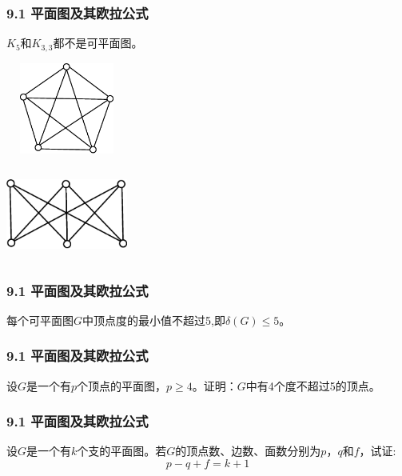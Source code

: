 \documentclass{beamer}
\begin{document}
\begin{CJK}{UTF8}{gbsn}
\begin{frame}
\end{frame}
\begin{frame}
  \frametitle{9.1 平面图及其欧拉公式}
  \begin{corollary9.1.5}
    $K_5$和$K_{3,3}$都不是可平面图。
  \end{corollary9.1.5}
\vspace{1cm}
  \begin{minipage}{0.45\linewidth}
\includegraphics[width=4cm,height=3cm]{k5}    
  \end{minipage}
  \begin{minipage}{0.45\linewidth}
    \includegraphics[width=4cm,height=3cm]{k33}
  \end{minipage}
\end{frame}
\begin{frame}
  \frametitle{9.1 平面图及其欧拉公式}
  \begin{corollary9.1.6}
    每个可平面图$G$中顶点度的最小值不超过5,即$\delta (G) \leq 5$。
  \end{corollary9.1.6}
\end{frame}
\begin{frame}
  \frametitle{9.1 平面图及其欧拉公式}
  \begin{exercise1}
    设$G$是一个有$p$个顶点的平面图，$p \geq 4$。证明：$G$中有4个度不超过5的顶点。
  \end{exercise1}
\end{frame}
\begin{frame}
  \frametitle{9.1 平面图及其欧拉公式}
  \begin{exercise2}
    设$G$是一个有$k$个支的平面图。若$G$的顶点数、边数、面数分别为$p$，$q$和$f$，试证:
    \begin{equation*}
      p - q + f = k + 1
    \end{equation*}
  \end{exercise2}
\end{frame}


\end{CJK}
\end{document}
